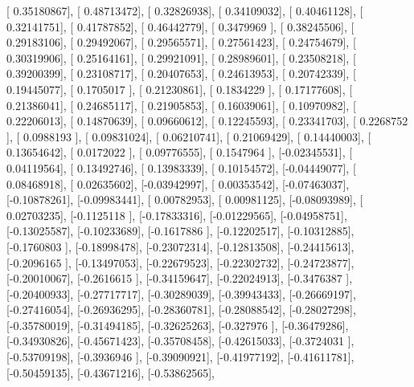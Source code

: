 \documentclass{article}
\begin{document}
       [ 0.35180867],
       [ 0.48713472],
       [ 0.32826938],
       [ 0.34109032],
       [ 0.40461128],
       [ 0.32141751],
       [ 0.41787852],
       [ 0.46442779],
       [ 0.3479969 ],
       [ 0.38245506],
       [ 0.29183106],
       [ 0.29492067],
       [ 0.29565571],
       [ 0.27561423],
       [ 0.24754679],
       [ 0.30319906],
       [ 0.25164161],
       [ 0.29921091],
       [ 0.28989601],
       [ 0.23508218],
       [ 0.39200399],
       [ 0.23108717],
       [ 0.20407653],
       [ 0.24613953],
       [ 0.20742339],
       [ 0.19445077],
       [ 0.1705017 ],
       [ 0.21230861],
       [ 0.1834229 ],
       [ 0.17177608],
       [ 0.21386041],
       [ 0.24685117],
       [ 0.21905853],
       [ 0.16039061],
       [ 0.10970982],
       [ 0.22206013],
       [ 0.14870639],
       [ 0.09660612],
       [ 0.12245593],
       [ 0.23341703],
       [ 0.2268752 ],
       [ 0.0988193 ],
       [ 0.09831024],
       [ 0.06210741],
       [ 0.21069429],
       [ 0.14440003],
       [ 0.13654642],
       [ 0.0172022 ],
       [ 0.09776555],
       [ 0.1547964 ],
       [-0.02345531],
       [ 0.04119564],
       [ 0.13492746],
       [ 0.13983339],
       [ 0.10154572],
       [-0.04449077],
       [ 0.08468918],
       [ 0.02635602],
       [-0.03942997],
       [ 0.00353542],
       [-0.07463037],
       [-0.10878261],
       [-0.09983441],
       [ 0.00782953],
       [ 0.00981125],
       [-0.08093989],
       [ 0.02703235],
       [-0.1125118 ],
       [-0.17833316],
       [-0.01229565],
       [-0.04958751],
       [-0.13025587],
       [-0.10233689],
       [-0.1617886 ],
       [-0.12202517],
       [-0.10312885],
       [-0.1760803 ],
       [-0.18998478],
       [-0.23072314],
       [-0.12813508],
       [-0.24415613],
       [-0.2096165 ],
       [-0.13497053],
       [-0.22679523],
       [-0.22302732],
       [-0.24723877],
       [-0.20010067],
       [-0.2616615 ],
       [-0.34159647],
       [-0.22024913],
       [-0.3476387 ],
       [-0.20400933],
       [-0.27717717],
       [-0.30289039],
       [-0.39943433],
       [-0.26669197],
       [-0.27416054],
       [-0.26936295],
       [-0.28360781],
       [-0.28088542],
       [-0.28027298],
       [-0.35780019],
       [-0.31494185],
       [-0.32625263],
       [-0.327976  ],
       [-0.36479286],
       [-0.34930826],
       [-0.45671423],
       [-0.35708458],
       [-0.42615033],
       [-0.3724031 ],
       [-0.53709198],
       [-0.3936946 ],
       [-0.39090921],
       [-0.41977192],
       [-0.41611781],
       [-0.50459135],
       [-0.43671216],
       [-0.53862565],
\end{document}
